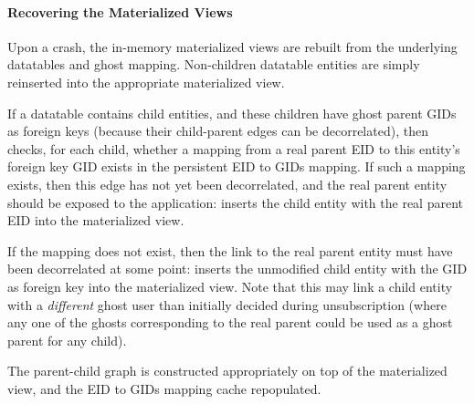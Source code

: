 \paragraph{Recovering the Materialized Views}
Upon a crash, the in-memory materialized views are rebuilt from the underlying datatables and ghost
mapping. Non-children datatable entities are simply reinserted into the appropriate
materialized view. 

If a datatable contains child entities, and these children have ghost parent GIDs as foreign
keys (because their child-parent edges can be decorrelated), then \sys{} checks, for each child, whether a mapping
from a real parent EID to this entity's foreign key GID exists in the persistent EID to GIDs
mapping. If such a mapping exists, then this edge has not yet been decorrelated, and the real parent
entity should be exposed to the application: \sys{} inserts the child entity with the real parent
EID into the materialized view.

If the mapping does not exist, then the link to the real parent entity must have been decorrelated at some point:
\sys{} inserts the unmodified child entity with the GID as foreign key into the materialized view.
Note that this may link a child entity with a \emph{different} ghost user than initially decided
during unsubscription (where any one of the ghosts corresponding to the real parent could be used as
a ghost parent for any child). 

The parent-child graph is constructed appropriately on top of the materialized view, and the EID to
GIDs mapping cache repopulated.
